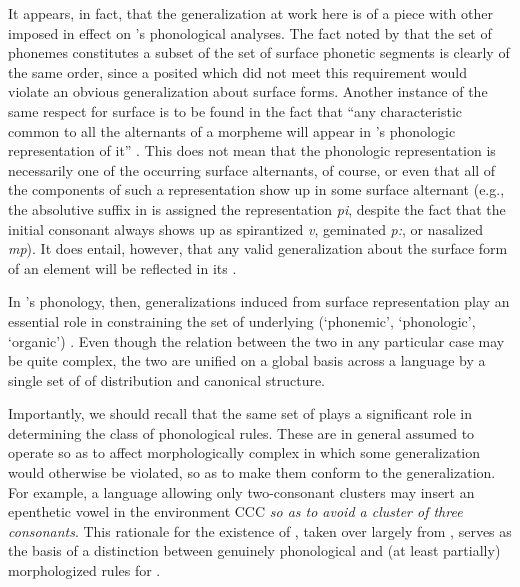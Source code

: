 It appears, in fact, that the generalization at work here is of a
piece with other  imposed in effect on {\Sapir}'s phonological
analyses. The fact noted by {\McCawley} that the set of phonemes
constitutes a subset of the set of surface phonetic segments is
clearly of the same order, since a posited  which did not meet
this requirement would violate an obvious generalization about surface
forms. Another instance of the same respect for surface 
is to be found in the fact that ``any characteristic common to all the
alternants of a morpheme will appear in {\Sapir}'s phonologic
representation of it'' \citep[110]{mccawley67:sapir}. This does not
mean that the phonologic representation is necessarily one of the
occurring surface alternants, of course, or even that all of the
components of such a representation show up in some surface alternant
(e.g., the absolutive suffix in  is assigned the
representation \emph{pi}, despite the fact that the initial consonant
always shows up as spirantized \emph{v}, geminated \emph{p:}, or
nasalized \emph{mp}). It does entail, however, that any valid
generalization about the surface form of an element will be reflected
in its .

In {\Sapir}'s phonology, then, generalizations induced from surface
representation play an essential role in constraining the set of
underlying (`phonemic', `phonologic', `organic') . Even
though the relation between the two in any particular case may be
quite complex, the two are unified on a global basis across a language
by a single set of  of distribution and canonical
structure.

Importantly, we should recall that the same set of  plays
a significant role in determining the class of phonological
rules. These are in general assumed to operate so as to affect
morphologically complex  in which some generalization
would otherwise be violated, so as to make them conform to the
generalization. For example, a language allowing only two-consonant
clusters may insert an epenthetic vowel in the environment
CC{\gapline}C \emph{so as to avoid a cluster of three
  consonants}. This rationale for the existence of ,
taken over largely from {\Boas}, serves as the basis of a distinction
between genuinely phonological and (at least partially) morphologized
rules for {\Sapir}.

